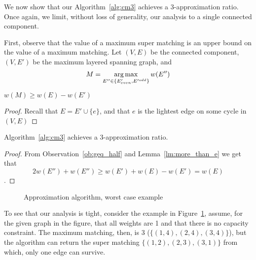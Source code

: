 We now show that our Algorithm~\ref{alg:cm3} achieves a 3-approximation ratio.
Once again, we limit, without loss of generality, our analysis to a single connected component.

First, observe that the value of a maximum super matching is an upper bound on the value
of a maximum matching.
Let $(V, E)$ be the connected component, $(V, E')$ be the maximum layered spanning graph, 
and 
$$ M = \operatorname*{arg\,max}_{E'' \in \{ E'_{even}, E'^{odd} \}}{w(E'')} $$

\begin{lemma}
\label{lm:more_than_e}
$w(M) \geq w(E) - w(E')$
\end{lemma}

\begin{proof}
Recall that $E = E' \cup \{e\}$, and that $e$ is the lightest edge on some cycle in $(V, E)$ 
\end{proof}

\begin{theorem}
Algorithm~\ref{alg:cm3} achieves a 3-approximation ratio.
\end{theorem}

\begin{proof}
From Observation~\ref{ob:geq_half} and Lemma~\ref{lm:more_than_e} we get that
$$ 2w(E'') + w(E'') \geq w(E') + w(E) - w(E') = w(E) $$.
\end{proof}

\begin{figure}
\centering

\caption{
\label{fig:3cm-tight-fig}
Approximation algorithm, worst case example
}
\end{figure}

To see that our analysis is tight, consider the example in Figure~\ref{fig:3cm-tight-fig},
assume, for the given graph in the figure, 
that all weights are 1 and that there is no capacity constraint.
The maximum matching, then, is 3 ($\{(1,4), (2,4), (3,4)\}$), 
but the algorithm can return the super matching $\{(1,2), (2,3), (3,1)\}$ from which, 
only one edge can survive.  